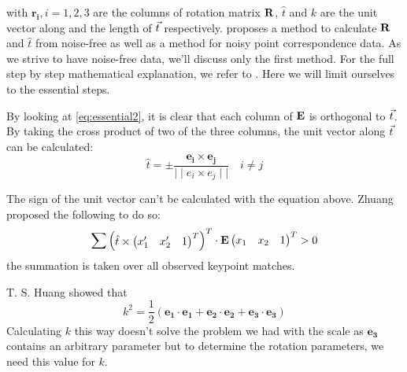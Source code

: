 with $\boldsymbol{r_i}, i = 1, 2, 3$ are the columns of rotation matrix $\mathbf{R}$, $\hat{t}$ and $k$ are the unit vector along and the length of $\vec t$ respectively. \cite{tekalp} proposes a method to calculate $\mathbf{R}$ and  $\hat{t}$ from noise-free as well as a method for noisy point correspondence data. As we strive to have noise-free data, we'll discuss only the first method. For the full step by step mathematical explanation, we refer to \cite{tekalp}. Here we will limit ourselves to the essential steps.\bigskip

By looking at \autoref{eq:essential2}, it is clear that each column of $\mathbf{E}$ is orthogonal to $\vec t$. By taking the cross product of two of the three columns, the unit vector along $\vec t$ can be calculated:
\begin{equation}
    \hat{t} = \pm \frac{\boldsymbol{e_i \times e_j}}{\mid\mid e_i \times e_j\mid\mid}
    \quad i \neq j
\end{equation}

The sign of the unit vector can't be calculated with the equation above. Zhuang \cite{ZHUANG1989175} proposed the following to do so:
\begin{equation}
    \sum\begin{pmatrix}
        \hat{t} \times \begin{pmatrix}
            x_1' & x_2' & 1
        \end{pmatrix}^T
    \end{pmatrix}^T
    \cdot \mathbf{E}\begin{pmatrix}
        x_1 & x_2 & 1
    \end{pmatrix}^T
    > 0
\end{equation}
the summation is taken over all observed keypoint matches.\bigskip

T. S. Huang \cite{improc} showed that 
\begin{equation}
    k^2 = \frac{1}{2}(\boldsymbol{e_1}\cdot\boldsymbol{e_1} + \boldsymbol{e_2}\cdot\boldsymbol{e_2} + \boldsymbol{e_3}\cdot\boldsymbol{e_3})
\end{equation}
Calculating $k$ this way doesn't solve the problem we had with the scale as $\boldsymbol{e_3}$ contains an arbitrary parameter but to determine the rotation parameters, we need this value for $k$.\bigskip


